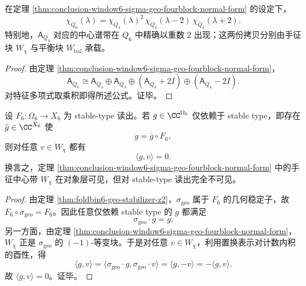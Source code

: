 \begin{corollary}\label{cor:conclusion-window6-centerband-doubling}
在定理 \ref{thm:conclusion-window6-sigma-geo-fourblock-normal-form} 的设定下，
\[
\chi_{Q_6}(\lambda)
=
\chi_{Q_4}(\lambda)^2\,
\chi_{Q_4}(\lambda-2)\,
\chi_{Q_4}(\lambda+2).
\]
特别地，\(\mathsf A_{Q_4}\) 对应的中心谱带在 \(Q_6\) 中精确以重数 \(2\) 出现；这两份拷贝分别由手征块 \(W_\chi\) 与平衡块 \(W_{\mathrm{bal}}\) 承载。
\end{corollary}
\begin{proof}
由定理 \ref{thm:conclusion-window6-sigma-geo-fourblock-normal-form}，
\[
\mathsf A_{Q_6}
\cong
\mathsf A_{Q_4}\oplus \mathsf A_{Q_4}\oplus (\mathsf A_{Q_4}+2I)\oplus (\mathsf A_{Q_4}-2I).
\]
对特征多项式取乘积即得所述公式。证毕。
\end{proof}

\begin{theorem}\label{thm:conclusion-window6-hidden-chiral-band-invisible}
设 \(F_6:\Omega_6\to X_6\) 为 stable-type 读出。若 \(g\in\CC^{\Omega_6}\) 仅依赖于 stable type，即存在 \(\bar g\in\CC^{X_6}\) 使
\[
g=\bar g\circ F_6,
\]
则对任意 \(v\in W_\chi\) 都有
\[
\langle g,v\rangle=0.
\]
换言之，定理 \ref{thm:conclusion-window6-sigma-geo-fourblock-normal-form} 中的手征中心带 \(W_\chi\) 在对象层可见，但对 stable-type 读出完全不可见。
\end{theorem}
\begin{proof}
由定理 \ref{thm:foldbin6-geo-stabilizer-z2}，\(\sigma_{\mathrm{geo}}\) 属于 \(F_6\) 的几何稳定子，故 \(F_6\circ \sigma_{\mathrm{geo}}=F_6\)。因此任意仅依赖 stable type 的 \(g\) 都满足
\[
\sigma_{\mathrm{geo}}\cdot g=g.
\]
另一方面，由定理 \ref{thm:conclusion-window6-sigma-geo-fourblock-normal-form}，\(W_\chi\) 正是 \(\sigma_{\mathrm{geo}}\) 的 \((-1)\)-等变块。于是对任意 \(v\in W_\chi\)，利用置换表示对计数内积的酉性，得
\[
\langle g,v\rangle
=
\langle \sigma_{\mathrm{geo}}\cdot g,\sigma_{\mathrm{geo}}\cdot v\rangle
=
\langle g,-v\rangle
=
-\langle g,v\rangle.
\]
故 \(\langle g,v\rangle=0\)。证毕。
\end{proof}


